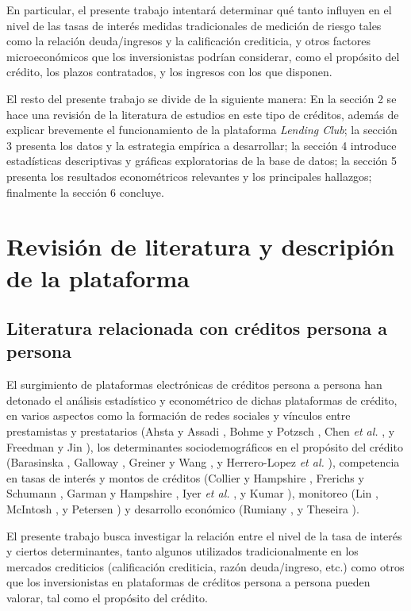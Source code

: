 \documentclass[12pt, fleqn, letterpaper, oneside]{amsart}
\begin{document}
En particular, el presente trabajo intentará determinar qué tanto influyen en el nivel de las tasas de interés medidas tradicionales de medición de riesgo tales como la relación deuda/ingresos y la calificación crediticia, y otros factores microeconómicos que los inversionistas podrían considerar, como el propósito del crédito, los plazos contratados, y los ingresos con los que disponen.

El resto del presente trabajo se divide de la siguiente manera: En la sección 2 se hace una revisión de la literatura de estudios en este tipo de créditos, además de explicar brevemente el funcionamiento de la plataforma \emph{Lending Club}; la sección 3 presenta los datos y la estrategia empírica a desarrollar; la sección 4 introduce estadísticas descriptivas y gráficas exploratorias de la base de datos; la sección 5 presenta los resultados econométricos relevantes y los principales hallazgos; finalmente la sección 6 concluye.

\section{Revisión de literatura y descripión de la plataforma}

\subsection{Literatura relacionada con créditos persona a persona}
El surgimiento de plataformas electrónicas de créditos persona a persona han detonado el análisis estadístico y econométrico de dichas plataformas de crédito, en varios aspectos como la formación de redes sociales y vínculos entre prestamistas y prestatarios (Ahsta y Assadi \cite{ashta}, Bohme y Potzsch \cite{bohme}, Chen \emph{et al.} \cite{chen}, y Freedman y Jin \cite{freedman}), los determinantes sociodemográficos en el propósito del crédito (Barasinska \cite{bara}, Galloway \cite{galloway}, Greiner y Wang \cite{greiner}, y Herrero-Lopez \emph{et al.} \cite{herreroetal}), competencia en tasas de interés y montos de créditos (Collier y Hampshire \cite{collier}, Frerichs y Schumann \cite{frerichs}, Garman y Hampshire \cite{garman}, Iyer \emph{et al.} \cite{iyer}, y Kumar \cite{kumar}), monitoreo (Lin \cite{lin}, McIntosh \cite{mcintosh}, y Petersen \cite{petersen}) y desarrollo económico (Rumiany \cite{rumiany}, y Theseira \cite{theseira}).

El presente trabajo busca investigar la relación entre el nivel de la tasa de interés y ciertos determinantes, tanto algunos utilizados tradicionalmente en los mercados crediticios (calificación crediticia, razón deuda/ingreso, etc.) como otros que los inversionistas en plataformas de créditos persona a persona pueden valorar, tal como el propósito del crédito. 
\end{document}
